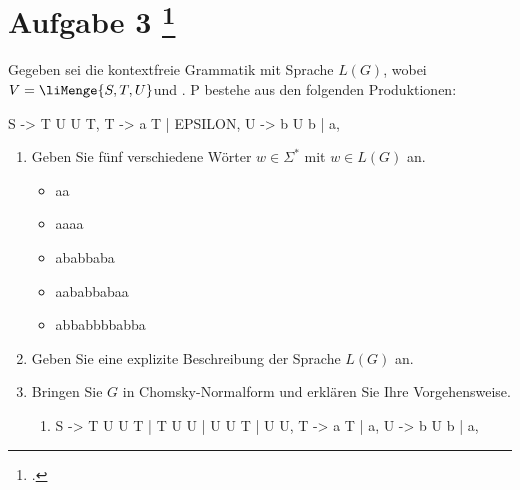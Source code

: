 \documentclass{lehramt-informatik-aufgabe}
\begin{document}
\let\schrittE=\liChomskyUeberErklaerung

\liAufgabenTitel{}
\section{Aufgabe 3
\footcite{66115:2019:09}}

Gegeben sei die kontextfreie Grammatik \liGrammatik{} mit Sprache $L(G)$,
wobei $V = \liMenge{S,T,U} $und . P bestehe aus den folgenden
Produktionen:

\begin{liProduktionsRegeln}
S -> T U U T,
T -> a T | EPSILON,
U -> b U b | a,
\end{liProduktionsRegeln}
\begin{enumerate}


\item Geben Sie fünf verschiedene Wörter $w \in \Sigma^*$ mit $w \in
L(G)$ an.

\begin{liAntwort}
\begin{itemize}
\item aa
\item aaaa
\item ababbaba
\item aababbabaa
\item abbabbbbabba
\end{itemize}
\end{liAntwort}


\item Geben Sie eine explizite Beschreibung der Sprache $L(G)$ an.

\begin{liAntwort}


\end{liAntwort}


\item Bringen Sie $G$ in Chomsky-Normalform und erklären Sie Ihre
Vorgehensweise.

\begin{liAntwort}
\begin{enumerate}
\item \schrittE{1}

\begin{liProduktionsRegeln}
S -> T U U T | T U U | U U T | U U,
T -> a T | a,
U -> b U b | a,
\end{liProduktionsRegeln}


\end{enumerate}
\end{liAntwort}
\end{enumerate}
\end{document}
